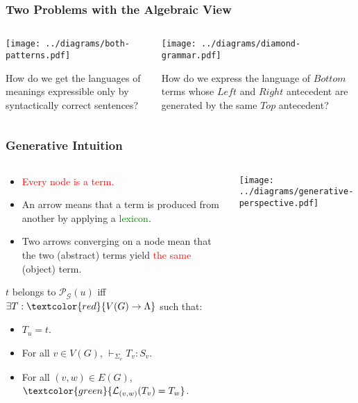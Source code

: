 \documentclass{beamer}
\begin{document}
\begin{frame}
  \frametitle{Two Problems with the Algebraic View}

  \begin{columns}[t]
    \begin{column}{0.5\textwidth}
      \texttt{[image: ../diagrams/both-patterns.pdf]}

      How do we get the languages of meanings expressible only by
      syntactically correct sentences?
    \end{column}
    \begin{column}{0.5\textwidth}
      \texttt{[image: ../diagrams/diamond-grammar.pdf]}

      How do we express the language of $Bottom$ terms whose $Left$ and
      $Right$ antecedent are generated by the same $Top$ antecedent?
    \end{column}
  \end{columns}
\end{frame}


\begin{frame}
  \frametitle{Generative Intuition}

  \begin{columns}[c]
    \begin{column}{0.7\textwidth}
      \begin{itemize}
      \item \textcolor{red}{Every node is a term.}
      \item An arrow means that a term is produced from another by
        applying a \textcolor{green}{lexicon}.
      \item Two arrows converging on a node mean that the two (abstract)
        terms yield \textcolor{red}{the same} (object) term.
      \end{itemize}

      \vspace{3 mm}

      $t$ belongs to $\mathcal{P}_{\mathcal{G}}(u)$ iff \\$\exists T :
      \textcolor{red}{V(G) \to \Lambda}$ such that:
      \begin{itemize}
      \item $T_u = t$.
      \item For all $v \in V(G)$, $\vdash_{\Sigma_v} T_v : S_v$.
      \item For all $(v,w) \in E(G)$,
        $\textcolor{green}{\mathcal{L}_{(v,w)}(T_v) = T_w}$.
      \end{itemize}
    \end{column}
    \begin{column}{0.3\textwidth}
      \texttt{[image: ../diagrams/generative-perspective.pdf]}
    \end{column}
  \end{columns}
\end{frame}
\end{document}
